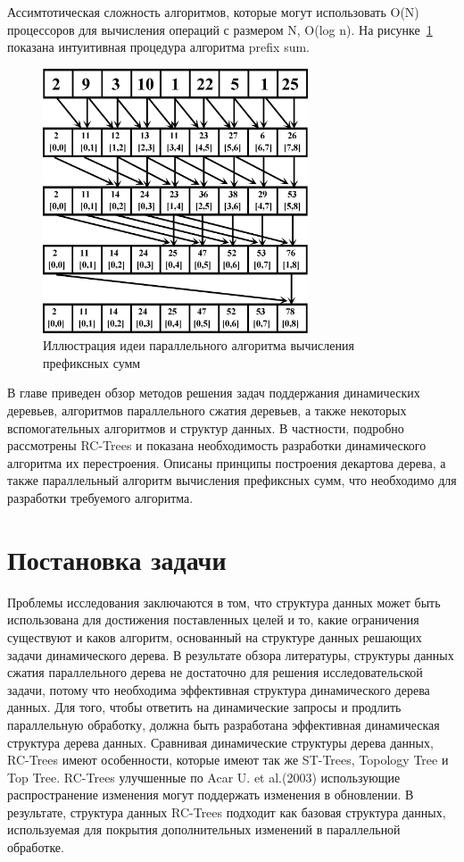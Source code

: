 \documentclass[specification,annotation]{itmo-student-thesis}
\begin{document}
Ассимтотическая сложность алгоритмов, которые могут использовать O(N) процессоров для вычисления операций с размером N, O(log n). На рисунке~\ref{fig:prefix-sum} показана интуитивная процедура алгоритма prefix sum.


\begin{figure}[!ht]
\centering
\includegraphics[width=0.7\textwidth]{pic/parallel-prefix-sum.png}
\caption{Иллюстрация идеи параллельного алгоритма вычисления префиксных сумм}\label{fig:prefix-sum}
\end{figure}

\chapterconclusion

В главе приведен обзор методов решения задач поддержания динамических деревьев, алгоритмов параллельного сжатия деревьев, а также некоторых вспомогательных алгоритмов и структур данных. 
В частности, подробно рассмотрены RC-Trees и показана необходимость разработки динамического алгоритма их перестроения. Описаны принципы построения декартова дерева, а также параллельный алгоритм вычисления префиксных сумм, что необходимо для разработки требуемого алгоритма. 


\chapter{Постановка задачи}


Проблемы исследования заключаются в том, что структура данных может быть использована для достижения поставленных целей и то, какие ограничения существуют и каков алгоритм, основанный на структуре данных решающих задачи динамического дерева. В результате обзора литературы, структуры данных сжатия параллельного дерева не достаточно для решения исследовательской задачи, потому что необходима эффективная структура 
динамического дерева данных. Для того, чтобы ответить на динамические запросы и продлить параллельную обработку, должна быть разработана эффективная динамическая структура дерева данных. Сравнивая динамические структуры дерева данных, RC-Trees имеют особенности, которые имеют так же ST-Trees, Topology Tree и Top Tree. RC-Trees улучшенные по Acar U. et al.(2003) использующие распространение изменения могут поддержать изменения в обновлении. В результате, структура данных RC-Trees подходит как базовая структура данных, используемая для покрытия дополнительных изменений в параллельной 
обработке.
\end{document}
